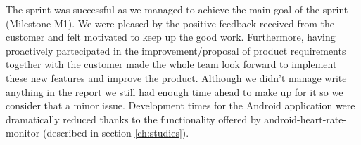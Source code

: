 The sprint was successful as we managed to achieve the main goal of the sprint (Milestone M1).
We were pleased by the positive feedback received from the customer and felt motivated to
keep up the good work. Furthermore, having proactively partecipated in the improvement/proposal
of product requirements together with the customer made the whole team look forward to implement these new
features and improve the product. Although we didn't manage write anything in the report we still had enough
time ahead to make up for it so we consider that a minor issue.
Development times for the Android application were dramatically reduced thanks to the functionality
offered by android-heart-rate-monitor (described in section \ref{ch:studies}).

